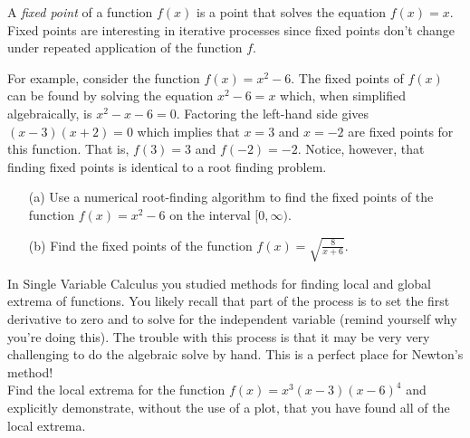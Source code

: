 \begin{problem}
    A {\it fixed point} of a function $f(x)$ is a point that solves the equation $f(x) =
    x$.  Fixed points are interesting in iterative processes since fixed points don't
    change under repeated application of the function $f$.  

    For example, consider the function $f(x) = x^2 - 6$.  The fixed points of $f(x)$ can be found by
    solving the equation $x^2 - 6 = x$ which, when simplified algebraically, is $x^2 - x -
    6 = 0$.  Factoring the left-hand side gives $(x-3)(x+2)=0$ which implies that $x=3$
    and $x=-2$ are fixed points for this function. That is, $f(3) = 3$ and $f(-2) = -2$.
    Notice, however, that finding fixed points is identical to a root finding problem.
    \begin{enumerate}
        \item[(a)] Use a numerical root-finding algorithm to find the fixed points of the
            function $f(x) = x^2 - 6$ on the interval $[0,\infty)$.
            \item[(b)] Find the fixed points of the function $f(x) =
                \sqrt{\frac{8}{x+6}}$.
    \end{enumerate}
\end{problem}

\begin{problem}
    In Single Variable Calculus you studied methods for finding local and global extrema
    of functions. You likely recall that part of the process is to set the first
    derivative to zero and to solve for the independent variable (remind yourself why
    you're doing this).  The trouble with this process is that it may be very very
    challenging to do the algebraic solve by hand.  This is a perfect place for Newton's
    method! \\
    Find the local extrema for the function $f(x) = x^3(x-3)(x-6)^4$ and explicitly
    demonstrate, without the use of a plot, that you have found all of the local extrema.
\end{problem}


